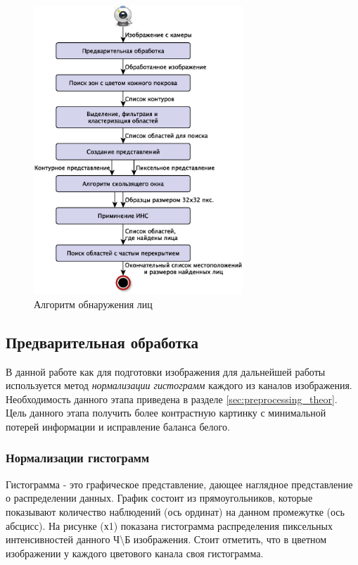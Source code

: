 \documentclass[12pt]{report}
\begin{document}
\begin{figure}[h]
	\centering
	\includegraphics[width=0.7\textwidth]{Pictures/face_detect_module2.eps}
	\caption{Алгоритм обнаружения лиц}
	\label{fig:face_detect_module1}
\end{figure}

\subsection{Предварительная обработка}

В данной работе как для подготовки изображения для дальнейшей работы используется метод \emph{нормализации гистограмм} каждого из каналов изображения. Необходимость данного этапа приведена в разделе \ref{sec:preprocessing_theor}. Цель данного этапа получить более контрастную картинку с минимальной потерей информации и исправление баланса белого.

\subsubsection{Нормализации гистограмм}
Гистограмма - это графическое представление, дающее наглядное представление о распределении данных. График состоит из прямоугольников, которые показывают количество наблюдений (ось ординат) на данном промежутке (ось абсцисс). На рисунке (х1) показана гистограмма распределения пиксельных интенсивностей данного Ч\textbackslash{}Б изображения. Стоит отметить, что в цветном изображении у каждого цветового канала своя гистограмма.
\end{document}

